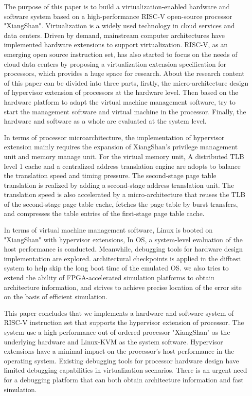 \begin{eabstract}
The purpose of this paper is to build a virtualization-enabled hardware and software system based on a high-performance RISC-V open-source processor "XiangShan".
Virtualization is a widely used technology in cloud services and data centers.
Driven by demand, mainstream computer architectures have implemented hardware extensions to support virtualization.
RISC-V, as an emerging open source instruction set,
has also started to focus on the needs of cloud data centers by proposing a virtualization extension specification for processors,
which provides a huge space for research.
About the research content of this paper can be divided into three parts, firstly, the micro-architecture design of hypervisor extension of processors at the hardware level.
Then based on the hardware platform to adapt the virtual machine management software, try to start the management software and virtual machine in the processor.
Finally, the hardware and software as a whole are evaluated at the system level.

In terms of processor microarchitecture,
the implementation of hypervisor extension mainly requires the expansion of XiangShan's privilege management unit and memory manage unit.
For the virtual memory unit, A distributed TLB level 1 cache and a centralized address translation engine are adopts to balance the translation speed and timing pressure.
The second-stage page table translation is realized by adding a second-stage address translation unit.
The translation speed is also accelerated by a micro-architecture that reuses the TLB of the second-stage page table cache, fetches the page table by burst transfers, and compresses the table entries of the first-stage page table cache.

In terms of virtual machine management software,
Linux is booted on "XiangShan" with hypervisor extensions,
In OS, a system-level evaluation of the host performance is conducted.
Meanwhile, debugging tools for hardware design implementation are explored.
architectural checkpoints is applied in the difftest system to help skip the long boot time of the emulated OS.
we also tries to extend the ability of FPGA-accelerated simulation platforms to obtain architecture information, and strives to achieve precise location of the error site on the basis of efficient simulation.
  
This paper concludes that we implements a hardware and software system of RISC-V instruction set that supports the hypervisor extension of processor.
The system use a high-performance out of ordered processor "XiangShan" as the underlying hardware and Linux-KVM as the system software.
Hypervisor extensions have a minimal impact on the processor's host performance in the operating system.
Existing debugging tools for processor hardware design have limited debugging capabilities in virtualization scenarios.
There is an urgent need for a debugging platform that can both obtain architecture information and fast simulation.
\end{eabstract}
